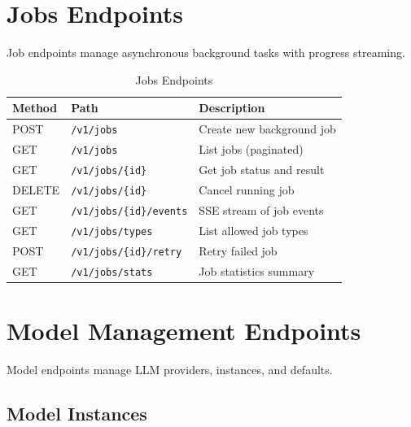 \section{Jobs Endpoints}
\label{app:api:jobs}

Job endpoints manage asynchronous background tasks with progress streaming.

\begin{table}[ht]
\centering
\caption{Jobs Endpoints}
\label{tab:jobs-endpoints}
\small
\begin{tabularx}{\textwidth}{llX}
    \hline
    \textbf{Method} & \textbf{Path} & \textbf{Description} \\
    \hline
    POST & \texttt{/v1/jobs} & Create new background job \\
    GET & \texttt{/v1/jobs} & List jobs (paginated) \\
    GET & \texttt{/v1/jobs/\{id\}} & Get job status and result \\
    DELETE & \texttt{/v1/jobs/\{id\}} & Cancel running job \\
    GET & \texttt{/v1/jobs/\{id\}/events} & SSE stream of job events \\
    GET & \texttt{/v1/jobs/types} & List allowed job types \\
    POST & \texttt{/v1/jobs/\{id\}/retry} & Retry failed job \\
    GET & \texttt{/v1/jobs/stats} & Job statistics summary \\
    \hline
\end{tabularx}
\end{table}

\section{Model Management Endpoints}
\label{app:api:models}

Model endpoints manage LLM providers, instances, and defaults.

\subsection{Model Instances}

